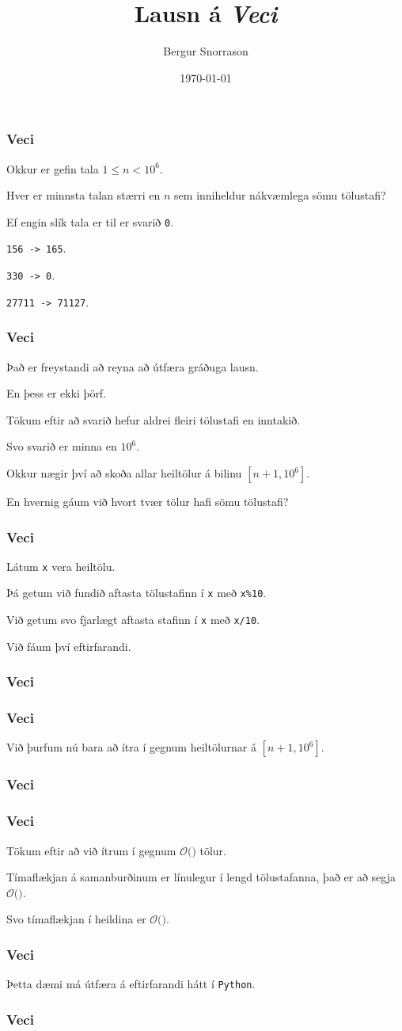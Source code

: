 \title{Lausn á \emph{Veci}}
\author{Bergur Snorrason}
\date{\today}



\frame{\titlepage}

{
	\frametitle{Veci}
	{
		\item<1-> Okkur er gefin tala $1 \leq n < 10^6$.
		\item<2-> Hver er minnsta talan stærri en $n$ sem inniheldur nákvæmlega sömu tölustafi?
		\item<3-> Ef engin slík tala er til er svarið \texttt{0}.
		\item<4-> \texttt{156 -> 165}.
		\item<5-> \texttt{330 -> 0}.
		\item<6-> \texttt{27711 -> 71127}.
	}
}

{
	\frametitle{Veci}
	{
		\item<1-> Það er freystandi að reyna að útfæra gráðuga lausn.
		\item<2-> En þess er ekki þörf.
		\item<3-> Tökum eftir að svarið hefur aldrei fleiri tölustafi en inntakið.
		\item<4-> Svo svarið er minna en $10^6$.
		\item<5-> Okkur nægir því að skoða allar heiltölur á bilinu $[n + 1, 10^6]$.
		\item<6-> En hvernig gáum við hvort tvær tölur hafi sömu tölustafi?
	}
}

{
	\frametitle{Veci}
	{
		\item<1-> Látum \texttt{x} vera heiltölu.
		\item<2-> Þá getum við fundið aftasta tölustafinn í \texttt{x} með \texttt{x\%10}.
		\item<3-> Við getum svo fjarlægt aftasta stafinn í \texttt{x} með \texttt{x/10}.
		\item<4-> Við fáum því eftirfarandi.
	}
}

{
	\frametitle{Veci}
}

{
	\frametitle{Veci}
	{
		\item<1-> Við þurfum nú bara að ítra í gegnum heiltölurnar á $[n + 1, 10^6]$.
	}
}

{
	\frametitle{Veci}
}

{
	\frametitle{Veci}
	{
		\item<1-> Tökum eftir að við ítrum í gegnum $\mathcal{O}($$)$ tölur.
		\item<3-> Tímaflækjan á samanburðinum er línulegur í lengd tölustafanna, það er að segja $\mathcal{O}($\onslide<4->{$\log n$}$)$.
		\item<5-> Svo tímaflækjan í heildina er $\mathcal{O}($\onslide<6->{$n \log n$}$)$.
	}
}

{
	\frametitle{Veci}
	{
		\item<1-> Þetta dæmi má útfæra á eftirfarandi hátt í \texttt{Python}.
	}
}

{
	\frametitle{Veci}
}

{
}


